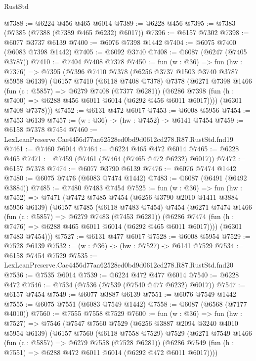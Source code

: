 \begin{lexlean}{RustStd}
\begin{coremodule}
{{@7388 := @6224 @456 @465 @6014
@7389 := @6228 @456
@7395 := @7383 (@7385 (@7388 (@7389 @465 @6232) @6017))
@7396 := @6157 @7302
@7398 := @6077 @3737 @6139
@7400 := @6076 @7398 @1442
@7404 := @6075 @7400 (@6083 @7398 @1442)
@7405 := @6092 @3740
@7408 := @6087 (@6247 (@7405 @3787))
@7410 := @7404 @7408 @7378
@7450 := fun (w : @36) =>
  fun (hw : @7376) =>
  @7395
    (@7396
      @7410
      @7378
      (@6256 @3737 @1503 @3740 @3787 @5958 @6139)
      (@6157
        @7410
        (@6118 @7408 @7378)
        @7378
        (@6271
          @7398
          @1466
          (fun (c : @5857) => @6279 @7408 (@7377 @6281))
          (@6286 @7398 (fun (h : @7400) => @6288 @456 @6011 @6014 (@6292 @456 @6011 @6017))))
        (@6301 @7408 @7378)))
@7452 := @6131 @472 @6017
@7453 := @6008 @5956
@7454 := @7453 @6139
@7457 := (w : @36) -> (hw : @7452) -> @6141 @7454
@7459 := @6158 @7378 @7454
@7460 := LexLeanPreserve.Cae4456d77aa62528ed0bd9d0612cd278.R87.RustStd.fnd19
@7461 := @7460 @6014
@7464 := @6224 @465 @472 @6014
@7465 := @6228 @465
@7471 := @7459 (@7461 (@7464 (@7465 @472 @6232) @6017))
@7472 := @6157 @7378
@7474 := @6077 @3790 @6139
@7476 := @6076 @7474 @1442
@7480 := @6075 @7476 (@6083 @7474 @1442)
@7483 := @6087 (@6491 (@6492 @3884))
@7485 := @7480 @7483 @7454
@7525 := fun (w : @36) =>
  fun (hw : @7452) =>
  @7471
    (@7472
      @7485
      @7454
      (@6256 @3790 @2010 @1411 @3884 @5956 @6139)
      (@6157
        @7485
        (@6118 @7483 @7454)
        @7454
        (@6271
          @7474
          @1466
          (fun (c : @5857) => @6279 @7483 (@7453 @6281))
          (@6286 @7474 (fun (h : @7476) => @6288 @465 @6011 @6014 (@6292 @465 @6011 @6017))))
        (@6301 @7483 @7454)))
@7527 := @6131 @477 @6017
@7528 := @6008 @5954
@7529 := @7528 @6139
@7532 := (w : @36) -> (hw : @7527) -> @6141 @7529
@7534 := @6158 @7454 @7529
@7535 := LexLeanPreserve.Cae4456d77aa62528ed0bd9d0612cd278.R87.RustStd.fnd20
@7536 := @7535 @6014
@7539 := @6224 @472 @477 @6014
@7540 := @6228 @472
@7546 := @7534 (@7536 (@7539 (@7540 @477 @6232) @6017))
@7547 := @6157 @7454
@7549 := @6077 @3887 @6139
@7551 := @6076 @7549 @1442
@7555 := @6075 @7551 (@6083 @7549 @1442)
@7558 := @6087 (@6568 (@7177 @4010))
@7560 := @7555 @7558 @7529
@7600 := fun (w : @36) =>
  fun (hw : @7527) =>
  @7546
    (@7547
      @7560
      @7529
      (@6256 @3887 @2094 @3240 @4010 @5954 @6139)
      (@6157
        @7560
        (@6118 @7558 @7529)
        @7529
        (@6271
          @7549
          @1466
          (fun (c : @5857) => @6279 @7558 (@7528 @6281))
          (@6286 @7549 (fun (h : @7551) => @6288 @472 @6011 @6014 (@6292 @472 @6011 @6017))))
}}
\end{coremodule}
\end{lexlean}
